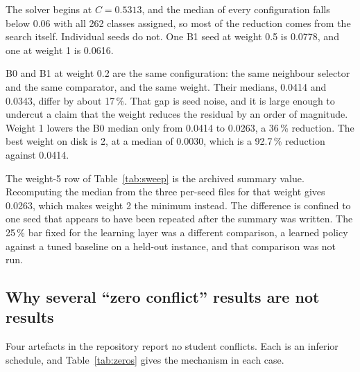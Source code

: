 The solver begins at $C = 0.5313$, and the median of every configuration falls below 0.06 with all
262 classes assigned, so most of the reduction comes from the search itself. Individual seeds do
not. One B1 seed at weight 0.5 is 0.0778, and one at weight 1 is 0.0616.

B0 and B1 at weight 0.2 are the same configuration: the same neighbour selector and the same
comparator, and the same weight. Their medians, 0.0414 and 0.0343, differ by about 17\,\%. That
gap is seed noise, and it is large enough to undercut a claim that the weight reduces the residual
by an order of magnitude. Weight 1 lowers the B0 median only from 0.0414 to 0.0263, a 36\,\%
reduction. The best weight on disk is 2, at a median of 0.0030, which is a 92.7\,\% reduction
against 0.0414.

The weight-5 row of Table~\ref{tab:sweep} is the archived summary value. Recomputing the median
from the three per-seed files for that weight gives 0.0263, which makes weight 2 the minimum
instead. The difference is confined to one seed that appears to have been repeated after the
summary was written. The 25\,\% bar fixed for the learning layer was a different comparison, a
learned policy against a tuned baseline on a held-out instance, and that comparison was not run.

\subsection{Why several ``zero conflict'' results are not results}

Four artefacts in the repository report no student conflicts. Each is an inferior schedule, and
Table~\ref{tab:zeros} gives the mechanism in each case.

